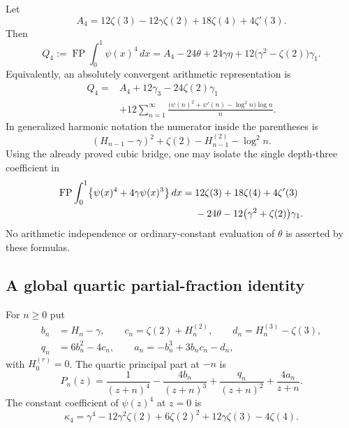 \begin{theorem}\label{q4:main}
Let
\[
 A_4=12\zeta(3)-12\gamma\zeta(2)+18\zeta(4)+4\zeta'(3).
\]
Then
\begin{equation}\label{q4:bridge}
 \boxed{\displaystyle
 Q_4:=\operatorname{FP}\int_0^1\psi(x)^4\,dx
 =A_4-24\theta+24\gamma\eta
        +12\bigl(\gamma^2-\zeta(2)\bigr)\gamma_1.}
\end{equation}
Equivalently, an absolutely convergent arithmetic representation is
\begin{equation}\label{q4:arithmetic}
 \boxed{\begin{aligned}
 Q_4={}&A_4+12\gamma_3-24\zeta(2)\gamma_1\\
 &+12\sum_{n=1}^{\infty}
 \frac{\bigl(\psi(n)^2+\psi'(n)-\log^2n\bigr)\log n}{n}.
 \end{aligned}}
\end{equation}
In generalized harmonic notation the numerator inside the parentheses is
\[
 (H_{n-1}-\gamma)^2+\zeta(2)-H_{n-1}^{(2)}-\log^2n.
\]
Using the already proved cubic bridge, one may isolate the single
depth-three coefficient in
\begin{align}\label{q4:single-coordinate}
 \operatorname{FP}\int_0^1\bigl\{\psi(x)^4+4\gamma\psi(x)^3\bigr\}\,dx
 ={}&12\zeta(3)+18\zeta(4)+4\zeta'(3)\notag\\
 &-24\theta-12\bigl(\gamma^2+\zeta(2)\bigr)\gamma_1.
\end{align}
No arithmetic independence or ordinary-constant evaluation of $\theta$ is
asserted by these formulas.
\end{theorem}

\subsection{A global quartic partial-fraction identity}

For $n\geq0$ put
\begin{equation}\label{q4:coefficients}
 \begin{split}
 b_n&=H_n-\gamma,\qquad
 c_n=\zeta(2)+H_n^{(2)},\qquad
 d_n=H_n^{(3)}-\zeta(3),\\
 q_n&=6b_n^2-4c_n,\qquad
 a_n=-b_n^3+3b_nc_n-d_n,
 \end{split}
\end{equation}
with $H_0^{(r)}=0$.  The quartic principal part at $-n$ is
\begin{equation}\label{q4:Pn}
 P_n(z)=\frac1{(z+n)^4}-\frac{4b_n}{(z+n)^3}
             +\frac{q_n}{(z+n)^2}+\frac{4a_n}{z+n}.
\end{equation}
The constant coefficient of $\psi(z)^4$ at $z=0$ is
\begin{equation}\label{q4:kappa}
 \kappa_4=\gamma^4-12\gamma^2\zeta(2)+6\zeta(2)^2
                        +12\gamma\zeta(3)-4\zeta(4).
\end{equation}

